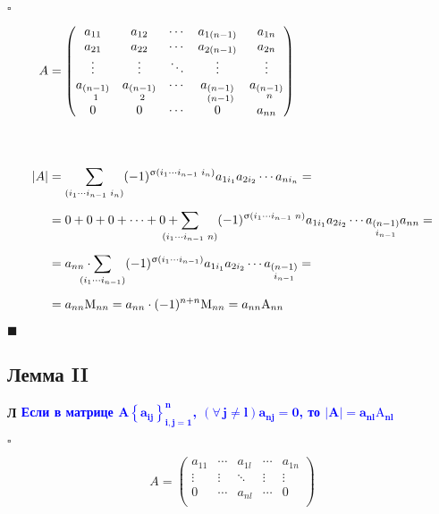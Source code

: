 \documentclass[12pt, a4paper]{report}
\newcommand{\sqbox}{%
	\collectbox{%
		\setlength{\fboxsep}{2pt}%
		\fbox{\BOXCONTENT}%
	}%
}
\newcommand{\lm}[1][]{\begin{flushleft}\textbf{\sqbox{Л} \textcolor{Blue}{#1}}\end{flushleft}}
\newcommand{\inlineperm}[3][i]{{#1}_{#2}\dotsb{#1}_{#3}}
\let\oldforall\forall
\renewcommand{\forall}{\oldforall\,}
\begin{document}
	\(\square\)
	
	\begin{gather}
	\begin{align*}
		A &=\begin{pmatrix}
			a_{11}&a_{12}&\cdots&a_{1(n-1)}&a_{1n}\\
			a_{21}&a_{22}&\cdots&a_{2(n-1)}&a_{2n}\\
			\vdots&\vdots&\ddots&\vdots&\vdots\\
			a_{\substack{(n-1)\\1}}&a_{\substack{(n-1)\\2}}&\cdots&a_{\substack{(n-1)\\(n-1)}}&a_{\substack{(n-1)\\n}}\\
			0&0&\cdots&0&a_{nn}\\
			\end{pmatrix}
		\\[35pt]
		|A| &= \sum_{(\inlineperm{1}{n-1}\,\,i_n)}(-1)^{\upsigma({\inlineperm{1}{n-1}\,\, i_n})}a_{1i_1}a_{2i_2}\cdots a_{ni_n}=\\[5pt]
		&=0+0+0+\dotsb+0+\smashoperator[l]{\sum_{(\inlineperm{1}{n-1}\,\,n)}}(-1)^{\upsigma(\inlineperm{1}{n-1}\,\,n)}a_{1i_1}a_{2i_2}\cdots a_{\substack{(n-1)\\i_{n-1}}}a_{nn}=\\[5pt]
		&=a_{nn}\cdot\smashoperator[l]{\sum_{(\inlineperm{1}{n-1})}}(-1)^{\upsigma(\inlineperm{1}{n-1})}a_{1i_1}a_{2i_2}\cdots a_{\substack{(n-1)\\i_{n-1}}}=\\[5pt]
		&=a_{nn}\mathrm{M}_{nn}=a_{nn}\cdot (-1)^{n+n}\mathrm{M}_{nn}=a_{nn}\mathrm{A}_{nn}
	\end{align*}
	\end{gather}
	
	\(\blacksquare\)
	\subsection{Лемма II}\label{2.5.3}
	
	\lm[Если в матрице \(\boldsymbol{A\left\{a_{ij}\right\}_{i,j=1}^{n}}\), \(\boldsymbol{\left(\forall j\neq l\right) a_{nj}=0}\), то \(\boldsymbol{|A|=a_{nl}\mathrm{A}_{nl}}\)]
	
	\(\square\)
	
	\[
		A = \begin{pmatrix}
				a_{11}&\cdots&a_{1l}&\cdots&a_{1n}\\
				\vdots&\vdots&\ddots&\vdots&\vdots\\
				0&\cdots&a_{nl}&\cdots&0\\
			\end{pmatrix}
	\]
	
\end{document}
